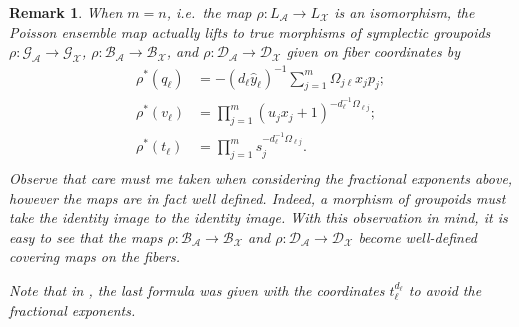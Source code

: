 \documentclass{amsart}
\newtheorem{remark}[theorem]{Remark}
\numberwithin{equation}{section}
\newcommand{\bfr}{{\boldsymbol{r}}}
\newcommand{\cA}{\mathcal{A}}
\newcommand{\cB}{\mathcal{B}}
\newcommand{\cD}{\mathcal{D}}
\newcommand{\cG}{\mathcal{G}}
\newcommand{\cO}{\mathcal{O}}
\newcommand{\cT}{\mathcal{T}}
\newcommand{\cX}{\mathcal{X}}
\newcommand{\CC}{\mathbb{C}}
\newcommand{\RR}{\mathbb{R}}
\newcommand{\rra}{\rightrightarrows}
\begin{document}
\begin{remark}
  \label{rmk:source-connected lift}
  When $m=n$, i.e.\ the map $\rho:L_\cA\to L_\cX$ is an isomorphism, the Poisson ensemble map actually lifts to true morphisms of symplectic groupoids $\rho:\cG_\cA\to\cG_\cX$, $\rho:\cB_\cA\to\cB_\cX$, and $\rho:\cD_\cA\to\cD_\cX$ given on fiber coordinates by 
  \begin{align*}
    \rho^*(q_\ell)&=-(d_\ell\hat y_\ell)^{-1}\sum\limits_{j=1}^m\Omega_{j\ell}x_jp_j;\\
    \rho^*(v_\ell)&=\prod\limits_{j=1}^m (u_j x_j + 1)^{-d_\ell^{-1}\Omega_{\ell j}};\\
    \rho^*(t_\ell)&=\prod\limits_{j=1}^m s_j^{-d_\ell^{-1}\Omega_{\ell j}}.\\
  \end{align*}
  Observe that care must me taken when considering the fractional exponents above, however the maps are in fact well defined.
  Indeed, a morphism of groupoids must take the identity image to the identity image.
  With this observation in mind, it is easy to see that the maps $\rho:\cB_\cA\to\cB_\cX$ and $\rho:\cD_\cA\to\cD_\cX$ become well-defined covering maps on the fibers.

	Note that in \cite{FG09c}, the last formula was given with the coordinates $t_\ell^{d_\ell}$ to avoid the fractional exponents.
\end{remark}


\end{document}
